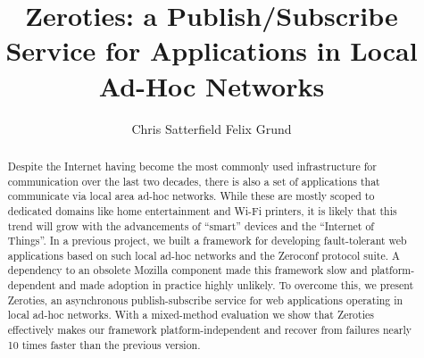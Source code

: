 \documentclass[sigconf]{acmart}
\title{Zeroties: a Publish/Subscribe Service for Applications in Local Ad-Hoc Networks}
\author{Chris Satterfield \qquad Felix Grund}
\affiliation{
    \institution{University of British Columbia}
    \city{Vancouver} 
    \state{BC} 
  }
\begin{document}
\begin{abstract}
Despite the Internet having become the most commonly used infrastructure for communication over the last two decades, there is also a set of applications that communicate via local area ad-hoc networks. 
While these are mostly scoped to dedicated domains like home entertainment and Wi-Fi printers, it is likely that this trend will grow with the advancements of ``smart'' devices and the ``Internet of Things''. 
In a previous project, we built a framework for developing fault-tolerant web applications based on such local ad-hoc networks and the Zeroconf protocol suite. 
A dependency to an obsolete Mozilla component made this framework slow and platform-dependent and made adoption in practice highly unlikely. 
To overcome this, we present Zeroties, an asynchronous publish-subscribe service for web applications operating in local ad-hoc networks. 
With a mixed-method evaluation we show that Zeroties effectively makes our framework platform-independent and recover from failures nearly 10 times faster than the previous version.
\end{abstract}

\maketitle



















\end{document}
